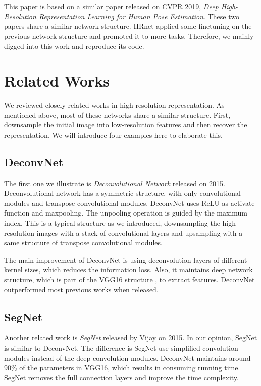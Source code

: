 \documentclass[10pt,twocolumn,letterpaper]{article}
\begin{document}
This paper is based on a similar paper released on CVPR 2019,
\emph{Deep High-Resolution Representation Learning for Human Pose Estimation}.\cite{sun2019deep}
These two papers share a similar network structure.
HRnet applied some finetuning on the previous network structure and promoted it to more tasks.
Therefore, we mainly digged into this work and reproduce its code.

\section{Related Works}

We reviewed closely related works in high-resolution representation.
As mentioned above, most of these networks share a similar structure.
First, downsample the initial image into low-resolution features and then recover the representation.
We will introduce four examples here to elaborate this.

\subsection{DeconvNet}

The first one we illustrate is \emph{Deconvolutional Network} released on 2015.\cite{noh2015learning}
Deconvolutional network has a symmetric structure,
with only convolutional modules and transpose convolutional modules.
DeconvNet uses ReLU as activate function and maxpooling.
The unpooling operation is guided by the maximum index.
This is a typical structure as we introduced,
downsampling the high-resolution images with a stack of convolutional layers and upsampling with a same structure of transpose convolutional modules.

The main improvement of DeconvNet is using deconvolution layers of different kernel sizes,
which reduces the information loss.
Also, it maintains deep network structure, which is part of the VGG16 structure \cite{zhang2015accelerating}, to extract features.
DeconvNet outperformed most previous works when released.

\subsection{SegNet}

Another related work is \emph{SegNet} released by Vijay on 2015.\cite{badrinarayanan2015segnet}
In our opinion, SegNet is similar to DeconvNet.
The difference is SegNet use simplified convolution modules instead of the deep convolution modules.
DeconvNet maintains around 90\% of the parameters in VGG16,
which results in consuming running time.
SegNet removes the full connection layers and improve the time complexity.
\end{document}

